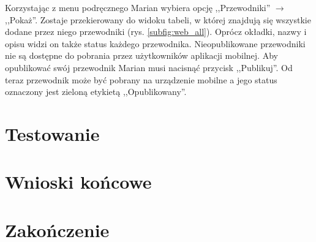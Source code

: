 \documentclass{book}
\begin{document}
		Korzystając z menu podręcznego Marian wybiera opcję ,,Przewodniki'' \ensuremath{\rightarrow} ,,Pokaż''. Zostaje przekierowany do widoku tabeli, w której znajdują się wszystkie dodane przez niego przewodniki (rys. \ref{subfig:web_all}). Oprócz okładki, nazwy i opisu widzi on także status każdego przewodnika. Nieopublikowane przewodniki nie są dostępne do pobrania przez użytkowników aplikacji mobilnej. Aby opublikować swój przewodnik Marian musi nacisnąć przycisk ,,Publikuj''. Od teraz przewodnik może być pobrany na urządzenie mobilne a jego status oznaczony jest zieloną etykietą ,,Opublikowany''. 
		
	
		
	\chapter{Testowanie}
	
	\chapter{Wnioski końcowe}
	
	\chapter{Zakończenie}
	
	
	
	
	
\end{document}
